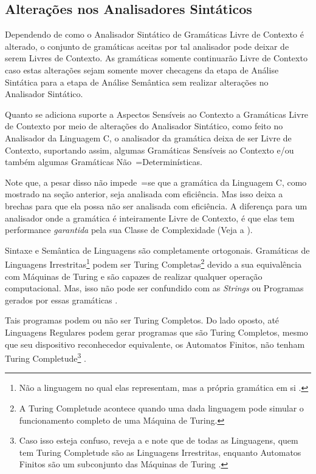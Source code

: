 \subsection{Alterações nos Analisadores Sintáticos}
\label{alteracoesNosAnalisadoresSintaticos}

Dependendo de como o Analisador Sintático de Gramáticas Livre de Contexto é alterado,
o conjunto de gramáticas aceitas por tal analisador pode deixar de serem Livres de Contexto.
As gramáticas somente continuarão Livre de Contexto caso estas alterações sejam somente mover checagens da etapa de Análise Sintática para a etapa de Análise Semântica sem realizar alterações no Analisador Sintático.

Quanto se adiciona suporte a Aspectos Sensíveis ao Contexto \cite{contextSensitiveParsing} a Gramáticas Livre de Contexto por meio de alterações do Analisador Sintático,
como feito no Analisador da Linguagem C,
o analisador da gramática deixa de ser Livre de Contexto,
suportando assim,
algumas Gramáticas Sensíveis ao Contexto e\slash{}ou também algumas Gramáticas Não~=Determinísticas.

Note que,
a pesar disso não impede~=se que a gramática da Linguagem C,
como mostrado na seção anterior,
seja analisada com eficiência.
Mas isso deixa a brechas para que ela possa não ser analisada com eficiência.
A diferença para um analisador onde a gramática é inteiramente Livre de Contexto,
é que elas tem performance \textit{garantida} pela sua Classe de Complexidade (Veja a ).

Sintaxe e
Semântica de Linguagens são completamente ortogonais.
Gramáticas de Linguagens Irrestritas\footnote{
Não a linguagem no qual elas representam,
mas a própria gramática em si \cite{finiteAutomataTuringComplete}.
}
podem ser Turing Completas\footnote{
A Turing Completude acontece quando uma dada linguagem pode simular o funcionamento completo de uma Máquina de Turing.
}
devido a sua equivalência com Máquinas de Turing e
são capazes de realizar qualquer operação computacional.
Mas,
isso não pode ser confundido com as \textit{Strings} ou
Programas gerados por essas gramáticas \cite{areThereDomainSpecificLanguages}.

Tais programas podem ou
não ser Turing Completos.
Do lado oposto,
até Linguagens Regulares podem gerar programas que são Turing Completos,
mesmo que seu dispositivo reconhecedor equivalente,
os Automatos Finitos,
não tenham Turing Completude\footnote{
Caso isso esteja confuso,
reveja a  e
note que de todas as Linguagens,
quem tem Turing Completude são as Linguagens Irrestritas,
enquanto Automatos Finitos são um subconjunto das Máquinas de Turing \cite{finiteAutomataTuringComplete}.
}
\cite{turingCompleteRegularLanguages,finiteAutomataTuringComplete}.

